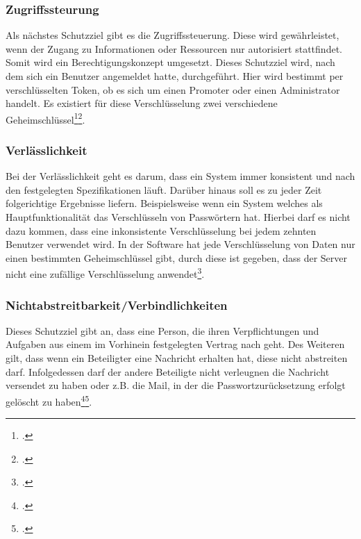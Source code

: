 \subsubsection{Zugriffssteurung}
Als nächstes Schutzziel gibt es die Zugriffssteuerung. Diese wird gewährleistet, wenn der Zugang zu Informationen oder Ressourcen nur autorisiert stattfindet. Somit wird ein Berechtigungskonzept umgesetzt. 
Dieses Schutzziel wird, nach dem sich ein Benutzer angemeldet hatte, durchgeführt. Hier wird bestimmt per verschlüsselten Token, ob es sich um einen Promoter oder einen Administrator handelt. Es existiert für diese Verschlüsselung zwei verschiedene Geheimschlüssel\footcite{Lehrunterlagen-HTL-cloud}\footcite{zugang}.

\subsubsection{Verlässlichkeit}
Bei der Verlässlichkeit geht es darum, dass ein System immer konsistent und nach den festgelegten Spezifikationen läuft. Darüber hinaus soll es zu jeder Zeit folgerichtige Ergebnisse liefern. Beispielsweise wenn ein System welches als Hauptfunktionalität das Verschlüsseln von Passwörtern hat. Hierbei darf es nicht dazu kommen, dass eine inkonsistente Verschlüsselung bei jedem zehnten Benutzer verwendet wird.
In der Software hat jede Verschlüsselung von Daten nur einen bestimmten Geheimschlüssel gibt, durch diese ist gegeben, dass der Server nicht eine zufällige Verschlüsselung anwendet\footcite{Lehrunterlagen-HTL-cloud}.


\subsubsection{Nichtabstreitbarkeit/Verbindlichkeiten}
Dieses Schutzziel gibt an, dass eine Person, die ihren Verpflichtungen und Aufgaben aus einem im Vorhinein festgelegten Vertrag nach geht. Des Weiteren gilt, dass wenn ein Beteiligter eine Nachricht erhalten hat, diese nicht abstreiten darf. Infolgedessen darf der andere Beteiligte nicht verleugnen die Nachricht versendet zu haben oder z.B. die Mail, in der die Passwortzurücksetzung erfolgt gelöscht zu haben\footcite{Lehrunterlagen-HTL-cloud}\footcite{non-repu}.

